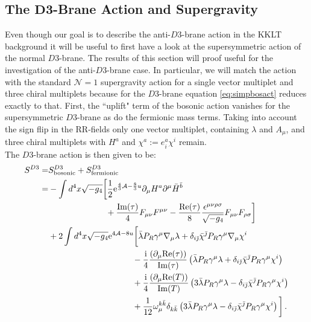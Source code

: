\documentclass[a4paper,12pt]{report}
\newcommand{\bea}{\begin{equation}\begin{aligned}}
\newcommand{\eea}{\end{aligned}\end{equation}}
\def\rmi{{\rm i}}
\def\rme{{\rm e}}
\def\jb{{\bar \jmath}}
\def\rmre{{\rm Re}}
\def\rmim{{\rm Im}}
\begin{document}
\subsection[The $D3$-Brane Action and Supergravity]{The $\mathbf{D3}$-Brane Action and Supergravity}
\label{sec:susyD3}
Even though our goal is to describe the anti-$D3$-brane action in the KKLT background it will be useful to first have a look at the supersymmetric action of the normal $D3$-brane. The results of this section will proof useful  for the investigation of the anti-$D3$-brane case. In particular, we will match the action with the standard $\mathcal{N}=1$ supergravity action for a single vector multiplet and three chiral multiplets because for the $D3$-brane equation \eqref{eq:simpbosact} reduces exactly to that. First, the ``uplift" term of the bosonic action vanishes for the supersymmetric $D3$-brane as do the fermionic mass terms. Taking into account the sign flip in the RR-fields only one vector multiplet, containing $\lambda$ and $A_\mu$, and three chiral multiplets with $H^a$ and $\chi^a := e^a_i \chi^i$ remain.\\
The $D3$-brane action is then given to be:
\bea 
S^{D3}
=& S^{D3}_{\text{bosonic}} + S^{D3}_{\text{fermionic}}\\
=& - \int d^4x \sqrt{-g_4} \bigg[ \frac{1}{2} \rme^{\frac{4}{3} \mathcal{A}-\frac{8}{3}u}\partial_\mu H^a \partial^\mu \bar{H}^{\bar{b}}\\
&\qquad\qquad\qquad\;\;\; + \frac{\rmim(\tau)}{4} F_{\mu\nu}F^{\mu\nu} - \frac{\rmre(\tau)}{8} \frac{\epsilon^{\mu\nu\rho\sigma}}{\sqrt{-g_4}} F_{\mu\nu}F_{\rho\sigma}\bigg]\\
& + 2 \int d^4x \sqrt{-g_4} \rme^{4\mathcal{A}-8u} \bigg[ \bar{\lambda} P_R \gamma^\mu \nabla_\mu \lambda + \delta_{i\jb} \bar{\chi}^\jb P_R \gamma^\mu \nabla_\mu \chi^i\\
&\qquad\qquad\qquad\qquad\qquad - \frac{\rmi}{4} \frac{\left(\partial_\mu \rmre(\tau)\right)}{\rmim(\tau)} \left( \bar{\lambda} P_R \gamma^\mu \lambda + \delta_{i\jb} \bar{\chi}^\jb P_R \gamma^\mu \chi^i\right)\\
&\qquad\qquad\qquad\qquad\qquad + \frac{\rmi}{4} \frac{\left(\partial_\mu \rmre(T)\right)}{\rmim(T)} \left(3 \bar{\lambda} P_R \gamma^\mu \lambda - \delta_{i\jb} \bar{\chi}^\jb P_R \gamma^\mu \chi^i\right)\\
&\qquad\qquad\qquad\qquad\qquad + \frac{1}{12} \omega_\mu^{k\bar{k}} \delta_{k\bar{k}} \left(3 \bar{\lambda} P_R \gamma^\mu \lambda - \delta_{i\jb} \bar{\chi}^\jb P_R \gamma^\mu \chi^i\right)\bigg]\,.
\label{eq:d3act}
\eea
\end{document}

